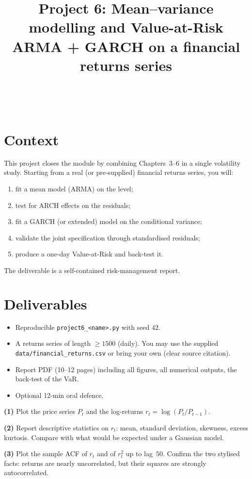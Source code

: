 \documentclass[a4paper,11pt]{article}
\title{Project 6: Mean--variance modelling and Value-at-Risk\\
\large ARMA + GARCH on a financial returns series}
\author{\auteurNom\\\auteurEmail\\\auteurInstitution}
\date{\anneeUniversitaire}
\begin{document}
\maketitle

\section*{Context}

This project closes the module by combining Chapters~3--6 in a single
volatility study. Starting from a real (or pre-supplied) financial
returns series, you will:
\begin{enumerate}
  \item fit a mean model (ARMA) on the level;
  \item test for ARCH effects on the residuals;
  \item fit a GARCH (or extended) model on the conditional variance;
  \item validate the joint specification through standardised
        residuals;
  \item produce a one-day Value-at-Risk and back-test it.
\end{enumerate}

The deliverable is a self-contained risk-management report.

\section*{Deliverables}
\begin{itemize}
  \item Reproducible \texttt{project6\_<name>.py} with seed $42$.
  \item A returns series of length $\geq 1500$ (daily). You may
        use the supplied \texttt{data/financial\_returns.csv} or
        bring your own (clear source citation).
  \item Report PDF (10--12 pages) including all figures, all
        numerical outputs, the back-test of the VaR.
  \item Optional 12-min oral defence.
\end{itemize}

\begin{exercise}
\textbf{(1)} Plot the price series $P_t$ and the log-returns
$r_t = \log(P_t / P_{t-1})$.

\textbf{(2)} Report descriptive statistics on $r_t$: mean, standard
deviation, skewness, excess kurtosis. Compare with what would be
expected under a Gaussian model.

\textbf{(3)} Plot the sample ACF of $r_t$ and of $r_t^2$ up to
lag~$50$. Confirm the two stylised facts: returns are nearly
uncorrelated, but their squares are strongly autocorrelated.
\end{exercise}
\end{document}

